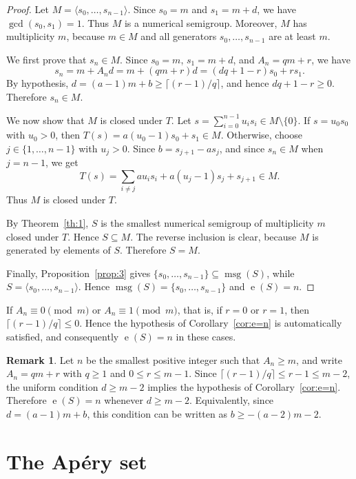 \documentclass[12pt,a4paper]{amsart}
\theoremstyle{definition}
\newtheorem{remark}[theorem]{Remark}
\begin{document}
\begin{proof}
Let $M=\langle s_0,\ldots,s_{n-1}\rangle$. Since $s_0=m$ and
$s_1=m+d$, we have $\gcd(s_0,s_1)=1$. Thus $M$ is a numerical semigroup.
Moreover, $M$ has multiplicity $m$, because $m\in M$ and all generators
$s_0,\ldots,s_{n-1}$ are at least $m$.

We first prove that $s_n\in M$. Since $s_0=m$, $s_1=m+d$, and
$A_n=qm+r$, we have
\[
s_n
=
m+A_nd
=
m+(qm+r)d
=
(dq+1-r)s_0+rs_1.
\]
By hypothesis, $d=(a-1)m+b\ge \lceil (r-1)/q\rceil$, and hence
$dq+1-r\ge 0$. Therefore $s_n\in M$.

We now show that $M$ is closed under $T$. Let
$s=\sum_{i=0}^{n-1}u_is_i\in M\setminus\{0\}$. If $s=u_0s_0$ with
$u_0>0$, then $T(s)=a(u_0-1)s_0+s_1\in M$. Otherwise, choose
$j\in\{1,\ldots,n-1\}$ with $u_j>0$. Since $b=s_{j+1}-as_j$, and since
$s_n\in M$ when $j=n-1$, we get
\[
T(s)
=
\sum_{i\ne j} au_is_i+a(u_j-1)s_j+s_{j+1}\in M.
\]
Thus $M$ is closed under $T$.

By Theorem~\ref{th:1}, $S$ is the smallest numerical semigroup of
multiplicity $m$ closed under $T$. Hence $S\subseteq M$. The reverse
inclusion is clear, because $M$ is generated by elements of $S$.
Therefore $S=M$.

Finally, Proposition~\ref{prop:3} gives
$\{s_0,\ldots,s_{n-1}\}\subseteq \operatorname{msg}(S)$, while
$S=\langle s_0,\ldots,s_{n-1}\rangle$. Hence
$\operatorname{msg}(S)=\{s_0,\ldots,s_{n-1}\}$ and
$\operatorname{e}(S)=n$.
\end{proof}

If $A_n\equiv 0\pmod m$ or $A_n\equiv 1\pmod m$, that is, if
$r=0$ or $r=1$, then $\lceil (r-1)/q\rceil\le 0$. Hence the hypothesis
of Corollary~\ref{cor:e=n} is automatically satisfied, and consequently
$\operatorname{e}(S)=n$ in these cases.

\begin{remark}\label{rem:e=n}
Let $n$ be the smallest positive integer such that $A_n\ge m$, and write
$A_n=qm+r$ with $q\ge 1$ and $0\le r\le m-1$. Since
$\lceil (r-1)/q\rceil\le r-1\le m-2$, the uniform condition
$d\ge m-2$ implies the hypothesis of Corollary~\ref{cor:e=n}. Therefore
$\operatorname{e}(S)=n$ whenever $d\ge m-2$. Equivalently, since
$d=(a-1)m+b$, this condition can be written as
$b\ge -(a-2)m-2$.
\end{remark}

\section{The Apéry set}\label{sec:apery}
\end{document}
